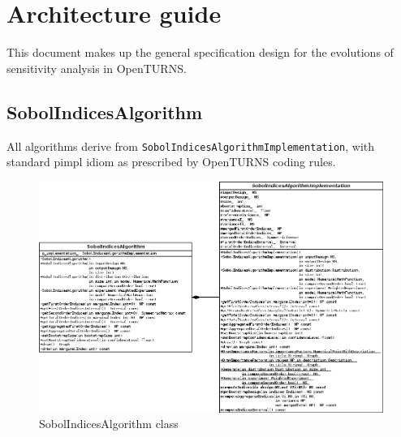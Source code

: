 %

\section{Architecture guide}

This document makes up the general specification design for the evolutions of sensitivity analysis
in OpenTURNS.

\subsection{SobolIndicesAlgorithm}

All algorithms derive from \texttt{SobolIndicesAlgorithmImplementation}, with standard pimpl idiom
as prescribed by OpenTURNS coding rules.

\begin{figure}[htb]
  \begin{center}
    \includegraphics[scale=0.5]{SobolIndicesAlgorithm.png}
    \caption{SobolIndicesAlgorithm class}\label{fig:archi:SobolIndicesAlgorithm}
  \end{center}
\end{figure}

